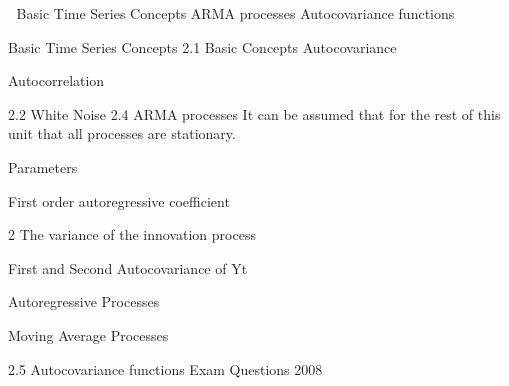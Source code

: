 

Basic Time Series Concepts
ARMA processes
Autocovariance functions


Basic Time Series Concepts
2.1 Basic Concepts
Autocovariance

Autocorrelation

2.2 White Noise
2.4 ARMA processes
It can be assumed that for the rest of this unit that all processes are stationary.

Parameters

   First order autoregressive coefficient

2 The variance of the innovation process




First and Second Autocovariance of Yt



Autoregressive Processes


Moving Average Processes


2.5 Autocovariance functions
Exam Questions
2008 


